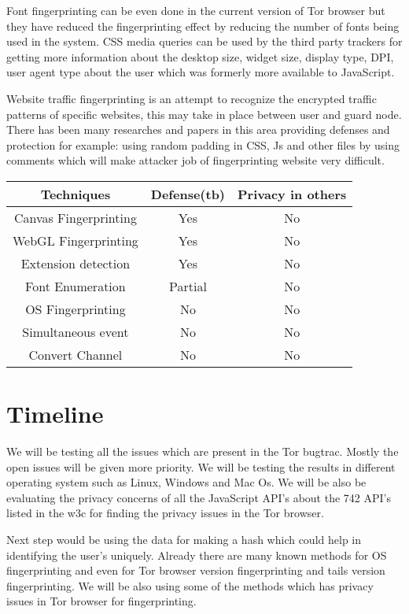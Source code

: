 \documentclass[conference]{IEEEtran}
\begin{document}
Font fingerprinting can be even done in the current version of Tor browser but they have reduced the fingerprinting effect by reducing the number of fonts being used in the system.
CSS media queries can be used by the third party trackers for getting more information about the desktop size, widget size, display type, DPI, user agent type about the user which was formerly more available to JavaScript.

Website traffic fingerprinting is an attempt to recognize the encrypted traffic patterns of specific websites, this may take in place between user and guard node. There has been many researches and papers in this area providing defenses and protection for example: using random padding in CSS, Js and other files by using comments which will make attacker job of fingerprinting website very difficult. 

\begin{center}
 \begin{tabular}{|c|c|c|} 
 \hline
 Techniques & Defense(tb) & Privacy in others  \\ [0.5ex] 
 \hline\hline
 Canvas Fingerprinting & Yes & No \\ [1ex]
 \hline
 WebGL Fingerprinting & Yes & No \\ [1ex]
 \hline
 Extension detection & Yes & No \\ [1ex]
 \hline
 Font Enumeration & Partial & No  \\ [1ex]
 \hline
 OS Fingerprinting & No & No \\ [1ex]
 \hline
 Simultaneous event & No & No \\ [1ex] 
 \hline
 Convert Channel & No & No \\ [1ex] 
 \hline
\end{tabular}
\end{center}

\section{Timeline}
We will be testing all the issues which are present in the Tor bugtrac. Mostly the open issues will be given more priority. We will be testing the results in different operating system such as Linux, Windows and Mac Os. We will be also be evaluating the privacy concerns of all the JavaScript API's about the 742 API's listed in the w3c for finding the privacy issues in the Tor browser.

Next step would be using the data for making a hash which could help in identifying the user's uniquely. Already there are many known methods for OS fingerprinting and even for Tor browser version fingerprinting and tails version fingerprinting. We will be also using some of the methods which has privacy issues in Tor browser for fingerprinting.
\end{document}
